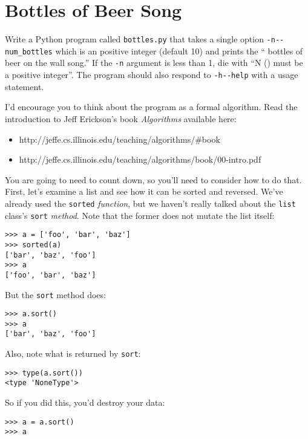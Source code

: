 \documentclass[]{article}
\providecommand{\tightlist}{%
  \setlength{\itemsep}{0pt}\setlength{\parskip}{0pt}}
\begin{document}
\hypertarget{bottles-of-beer-song}{%
\section{Bottles of Beer Song}\label{bottles-of-beer-song}}

Write a Python program called \texttt{bottles.py} that takes a single
option \texttt{-n\textbar{}-\/-num\_bottles} which is an positive
integer (default 10) and prints the `` bottles of beer on the wall
song.'' If the \texttt{-n} argument is less than 1, die with ``N () must
be a positive integer''. The program should also respond to
\texttt{-h\textbar{}-\/-help} with a usage statement.

I'd encourage you to think about the program as a formal algorithm. Read
the introduction to Jeff Erickson's book \emph{Algorithms} available
here:

\begin{itemize}
\tightlist
\item
  http://jeffe.cs.illinois.edu/teaching/algorithms/\#book
\item
  http://jeffe.cs.illinois.edu/teaching/algorithms/book/00-intro.pdf
\end{itemize}

You are going to need to count down, so you'll need to consider how to
do that. First, let's examine a list and see how it can be sorted and
reversed. We've already used the \texttt{sorted} \emph{function}, but we
haven't really talked about the \texttt{list} class's \texttt{sort}
\emph{method}. Note that the former does not mutate the list itself:

\begin{verbatim}
>>> a = ['foo', 'bar', 'baz']
>>> sorted(a)
['bar', 'baz', 'foo']
>>> a
['foo', 'bar', 'baz']
\end{verbatim}

But the \texttt{sort} method does:

\begin{verbatim}
>>> a.sort()
>>> a
['bar', 'baz', 'foo']
\end{verbatim}

Also, note what is returned by \texttt{sort}:

\begin{verbatim}
>>> type(a.sort())
<type 'NoneType'>
\end{verbatim}

So if you did this, you'd destroy your data:

\begin{verbatim}
>>> a = a.sort()
>>> a
\end{verbatim}
\end{document}
